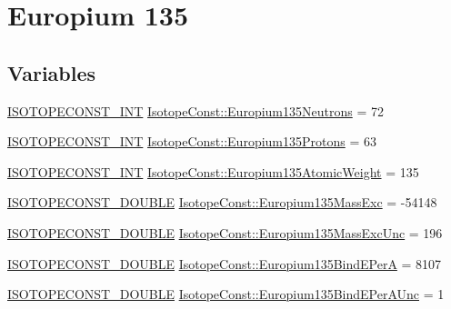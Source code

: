 \hypertarget{group___isotope_const-_europium-_eu135}{}\section{Europium 135}
\label{group___isotope_const-_europium-_eu135}
\subsection*{Variables}
\begin{DoxyCompactItemize}
\item 
\mbox{\hyperlink{group___isotope_const-_macros_ga5f18360b3e99483a35c32d789e62621c}{I\+S\+O\+T\+O\+P\+E\+C\+O\+N\+S\+T\+\_\+\+I\+NT}} \mbox{\hyperlink{group___isotope_const-_europium-_eu135_gaf9a01cb8b79ad7a6c676ab123f66e26d}{Isotope\+Const\+::\+Europium135\+Neutrons}} = 72
\item 
\mbox{\hyperlink{group___isotope_const-_macros_ga5f18360b3e99483a35c32d789e62621c}{I\+S\+O\+T\+O\+P\+E\+C\+O\+N\+S\+T\+\_\+\+I\+NT}} \mbox{\hyperlink{group___isotope_const-_europium-_eu135_gabc476120b0c6478a1d86ec2c2dddd96f}{Isotope\+Const\+::\+Europium135\+Protons}} = 63
\item 
\mbox{\hyperlink{group___isotope_const-_macros_ga5f18360b3e99483a35c32d789e62621c}{I\+S\+O\+T\+O\+P\+E\+C\+O\+N\+S\+T\+\_\+\+I\+NT}} \mbox{\hyperlink{group___isotope_const-_europium-_eu135_gaccc660a3d5eacba1a0100d15e1c5dffd}{Isotope\+Const\+::\+Europium135\+Atomic\+Weight}} = 135
\item 
\mbox{\hyperlink{group___isotope_const-_macros_ga8f45a7272ce02c0b4c65c44636ed719a}{I\+S\+O\+T\+O\+P\+E\+C\+O\+N\+S\+T\+\_\+\+D\+O\+U\+B\+LE}} \mbox{\hyperlink{group___isotope_const-_europium-_eu135_ga0eb4bee8e027f2f01256ae2588907eb7}{Isotope\+Const\+::\+Europium135\+Mass\+Exc}} = -\/54148
\item 
\mbox{\hyperlink{group___isotope_const-_macros_ga8f45a7272ce02c0b4c65c44636ed719a}{I\+S\+O\+T\+O\+P\+E\+C\+O\+N\+S\+T\+\_\+\+D\+O\+U\+B\+LE}} \mbox{\hyperlink{group___isotope_const-_europium-_eu135_gafa6b69ad1bca3bb23f08cf45b255d30e}{Isotope\+Const\+::\+Europium135\+Mass\+Exc\+Unc}} = 196
\item 
\mbox{\hyperlink{group___isotope_const-_macros_ga8f45a7272ce02c0b4c65c44636ed719a}{I\+S\+O\+T\+O\+P\+E\+C\+O\+N\+S\+T\+\_\+\+D\+O\+U\+B\+LE}} \mbox{\hyperlink{group___isotope_const-_europium-_eu135_ga332568ddc3b1a6b7819c337f4fb970d6}{Isotope\+Const\+::\+Europium135\+Bind\+E\+PerA}} = 8107
\item 
\mbox{\hyperlink{group___isotope_const-_macros_ga8f45a7272ce02c0b4c65c44636ed719a}{I\+S\+O\+T\+O\+P\+E\+C\+O\+N\+S\+T\+\_\+\+D\+O\+U\+B\+LE}} \mbox{\hyperlink{group___isotope_const-_europium-_eu135_ga8d07e104fd3b0e3c6d61a3199fa522b0}{Isotope\+Const\+::\+Europium135\+Bind\+E\+Per\+A\+Unc}} = 1

\end{DoxyCompactItemize}
